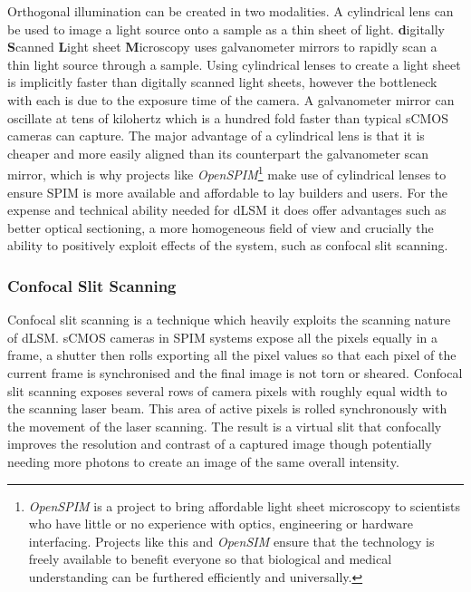 Orthogonal illumination can be created in two modalities.
A cylindrical lens can be used to image a light source onto a sample as a thin sheet of light.
\textbf{d}igitally \textbf{S}canned \textbf{L}ight sheet \textbf{M}icroscopy uses galvanometer mirrors to rapidly scan a thin light source through a sample\cite{Keller2008}.
Using cylindrical lenses to create a light sheet is implicitly faster than digitally scanned light sheets, however the bottleneck with each is due to the exposure time of the camera. %
A galvanometer mirror can oscillate at tens of kilohertz which is a hundred fold faster than typical sCMOS cameras can capture.
The major advantage of a cylindrical lens is that it is cheaper and more easily aligned than its counterpart the galvanometer scan mirror, which is why projects like \textit{OpenSPIM}\footnote{\textit{OpenSPIM} is a project to bring affordable light sheet microscopy to scientists who have little or no experience with optics, engineering or hardware interfacing.
Projects like this and \textit{OpenSIM} ensure that the technology is freely available to benefit everyone so that biological and medical understanding can be furthered efficiently and universally.}\cite{Gualda2013,Pitrone2013} make use of cylindrical lenses to ensure SPIM is more available and affordable to lay builders and users.
For the expense and technical ability needed for dLSM it does offer advantages such as better optical sectioning, a more homogeneous field of view and crucially the ability to positively exploit effects of the system, such as confocal slit scanning.

\subsubsection{Confocal Slit Scanning} %

Confocal slit scanning is a technique which heavily exploits the scanning nature of dLSM.
sCMOS cameras in SPIM systems expose all the pixels equally in a frame, a shutter then rolls exporting all the pixel values so that each pixel of the current frame is synchronised and the final image is not torn or sheared.
Confocal slit scanning exposes several rows of camera pixels with roughly equal width to  the scanning laser beam.
This area of active pixels is rolled synchronously with the movement of the laser scanning.
The result is a virtual slit that confocally improves the resolution and contrast of a captured image though potentially needing more photons to create an image of the same overall intensity\cite{Baumgart2012}.

